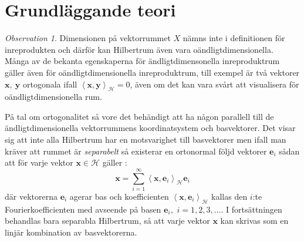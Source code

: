 \documentclass[a4paper, 12pt]{report}
\theoremstyle{definition}
\newtheorem{defi}{Definition}[section]
\theoremstyle{remark}
\newtheorem*{rem}{Observation}
\newcommand{\llangle}{\left\langle}
\newcommand{\rrangle}{\right\rangle}
\newcommand{\inprod}[2]{\llangle \mathbf{#1}, \mathbf{#2}\rrangle}
\newcommand{\hil}{\mathcal{H}}
\begin{document}
\section{Grundläggande teori}
%

\begin{rem}
Dimensionen på vektorrummet $X$ nämns inte i definitionen för inreprodukten och därför kan Hilbertrum även vara oändligtdimensionella. Många av de bekanta egenskaperna för ändligtdimensonella inreproduktrum gäller även för oändligtdimensionella inreproduktrum, till exempel är två vektorer $\mathbf{x}, ~\mathbf{y}$ ortogonala ifall $\inprod{x}{y}_\hil=0$, även om det kan vara svårt att visualisera för oändligtdimensionella rum.
\end{rem}
På tal om ortogonalitet så vore det behändigt att ha någon parallell till de ändligtdimensionella vektorrummens koordinatsystem och basvektorer. Det visar sig att inte alla Hilbertrum har en motsvarighet till basvektorer men ifall man kräver att rummet är \emph{separabelt} så existerar en ortonormal följd vektorer $\mathbf{e}_i$ sådan att för varje vektor $\mathbf{x}\in \mathcal{H}$  gäller \cite{Young}: %
\begin{equation*}
	\mathbf{x}=\sum_{i=1}^{\infty}\left\langle \mathbf{x}, \mathbf{e}_i \right\rangle_\hil \mathbf{e}_i
\end{equation*}
där vektorerna $\mathbf{e}_i$ agerar bas och koefficienten $\left\langle \mathbf{x}, \mathbf{e}_i \right\rangle_\hil$ kallas den $i$:te Fourierkoefficienten med avseende på basen $\mathbf{e}_i,$ $i=1,2,3,\dots$. I fortsättningen behandlas bara separabla Hilbertrum, så att varje vektor $\mathbf{x}$ kan skrivas som en linjär kombination av basvektorerna.
\end{document}
